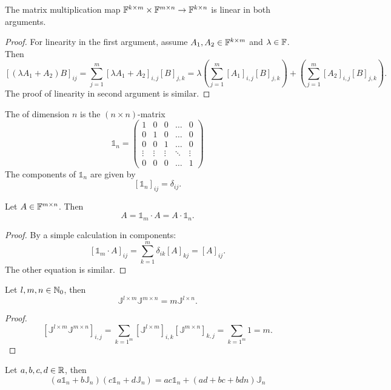 \begin{lemma} \label{linearityMatrixMultiplication}
The matrix multiplication map $\mathbb{F}^{k\times m}\times \mathbb{F}^{m\times n} \to \mathbb{F}^{k\times n}$ is linear in both arguments.
\end{lemma}
\begin{proof}
For linearity in the first argument, assume $A_1,A_2\in\mathbb{F}^{k\times m}$ and $\lambda\in \mathbb{F}$. Then
\[ [(\lambda A_1+ A_2)B]_{ij} = \sum_{j=1}^m[\lambda A_1+ A_2]_{i,j}[B]_{j,k} = \lambda \left(\sum_{j=1}^m[A_1]_{i,j}[B]_{j,k}\right) + \left(\sum_{j=1}^m[A_2]_{i,j}[B]_{j,k}\right). \]
The proof of linearity in second argument is similar.
\end{proof}

\begin{definition}
The  of dimension $n$ is the $(n\times n)$-matrix
\[ \mathbb{1}_n = \begin{pmatrix}
1 & 0 & 0 & \hdots & 0\\
0 & 1 & 0 & \hdots & 0\\
0 & 0 & 1 & \hdots & 0\\
\vdots & \vdots & \vdots & \ddots & \vdots \\
0 & 0 & 0 & \hdots & 1
\end{pmatrix} \]
The components of $\mathbb{1}_n$ are given by
\[ [\mathbb{1}_n]_{ij} = \delta_{ij}. \]
\end{definition}

\begin{lemma}
Let $A\in\mathbb{F}^{m\times n}$. Then
\[ A = \mathbb{1}_m\cdot A = A \cdot \mathbb{1}_n. \]
\end{lemma}
\begin{proof}
By a simple calculation in components:
\[ [\mathbb{1}_m\cdot A]_{ij} = \sum_{k=1}^m\delta_{ik}[A]_{kj} = [A]_{ij}. \]
The other equation is similar.
\end{proof}

\begin{lemma} \label{matrixOfOnesMultiplication}
Let $l,m,n\in\mathbb{N}_0$, then
\[ \mathbb{J}^{l\times m}\mathbb{J}^{m\times n} = m\mathbb{J}^{l\times n}. \]
\end{lemma}
\begin{proof}
\[ [\mathbb{J}^{l\times m}\mathbb{J}^{m\times n}]_{i,j} = \sum_{k=1^m}[\mathbb{J}^{l\times m}]_{i,k}[\mathbb{J}^{m\times n}]_{k,j} = \sum_{k=1^m}1 = m. \]
\end{proof}
\begin{corollary}
Let $a,b,c,d\in\mathbb{R}$, then
\[ (a\mathbb{1}_n + b\mathbb{J}_n)(c\mathbb{1}_n + d\mathbb{J}_n) = ac\mathbb{1}_n + (ad+bc +bdn)\mathbb{J}_n \]
\end{corollary}

